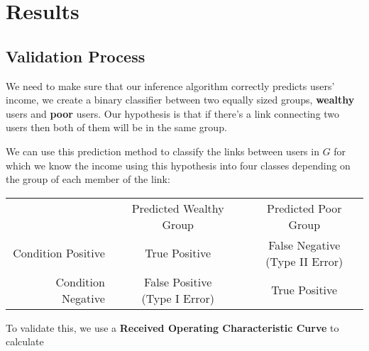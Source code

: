 \section{Results}

\subsection{Validation Process}

We need to make sure that our inference algorithm correctly predicts users' income, we create a binary classifier between two equally sized groups, \textbf{wealthy} users and \textbf{poor} users. Our hypothesis is that if there's a link connecting two users then both of them will be in the same group.

We can use this prediction method to classify the links between users in $ G $ for which we know the income using this hypothesis into four classes depending on the group of each member of the link:

\begin{tabularx}{\textwidth}{|r|c|c|}
& Predicted Wealthy Group & Predicted Poor Group \\
Condition Positive & \cellcolor{green} True Positive & \cellcolor{red} \makecell{False Negative \\ (Type II Error)} \\ 
Condition Negative & \cellcolor{red} \makecell{False Positive \\ (Type I Error)} & \cellcolor{green} True Positive \\
\end{tabularx}

To validate this, we use a \textbf{Received Operating Characteristic Curve} to calculate 